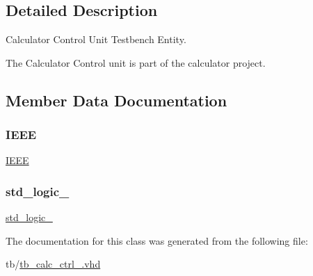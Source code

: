 \subsection{Detailed Description}
Calculator Control Unit Testbench Entity. 

The Calculator Control unit is part of the calculator project. 

\subsection{Member Data Documentation}
\mbox{\label{classtb__calc__ctrl_ae4f03c286607f3181e16b9aa12d0c6d4}} 
\subsubsection{\texorpdfstring{I\+E\+EE}{IEEE}}
{\footnotesize\ttfamily \hyperlink{classtb__calc__ctrl_ae4f03c286607f3181e16b9aa12d0c6d4}{I\+E\+EE}\hspace{0.3cm}{\ttfamily [Library]}}

\mbox{\label{classtb__calc__ctrl_acd03516902501cd1c7296a98e22c6fcb}} 
\subsubsection{\texorpdfstring{std\+\_\+logic\+\_}{std\_logic\_1164}}
{\footnotesize\ttfamily \hyperlink{classtb__calc__ctrl_acd03516902501cd1c7296a98e22c6fcb}{std\+\_\+logic\+\_}\hspace{0.3cm}{\ttfamily [Package]}}



The documentation for this class was generated from the following file\+:\begin{DoxyCompactItemize}
\item 
tb/\hyperlink{tb__calc__ctrl___8vhd}{tb\+\_\+calc\+\_\+ctrl\+\_\+.\+vhd}\end{DoxyCompactItemize}
